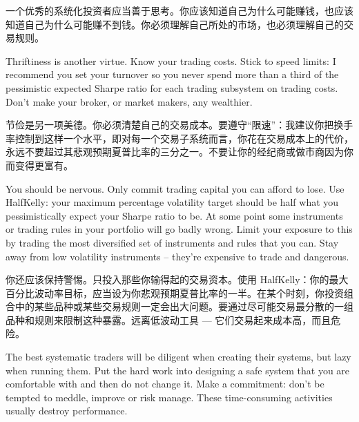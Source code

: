 \begin{chineseblock}一个优秀的系统化投资者应当善于思考。你应该知道自己为什么可能赚钱，也应该知道自己为什么可能赚不到钱。你必须理解自己所处的市场，也必须理解自己的交易规则。\end{chineseblock}

\bipairgap

\begin{englishblock} Thriftiness is another virtue. Know your trading costs. Stick to speed limits: I recommend you set your turnover so you never spend more than a third of the pessimistic expected Sharpe ratio for each trading subsystem on trading costs. Don't make your broker, or market makers, any wealthier. \end{englishblock}

\begin{chineseblock}节俭是另一项美德。你必须清楚自己的交易成本。要遵守“限速”：我建议你把换手率控制到这样一个水平，即对每一个交易子系统而言，你花在交易成本上的代价，永远不要超过其悲观预期夏普比率的三分之一。不要让你的经纪商或做市商因为你而变得更富有。\end{chineseblock}

\bipairgap

\begin{englishblock} You should be nervous. Only commit trading capital you can afford to lose. Use HalfKelly: your maximum percentage volatility target should be half what you pessimistically expect your Sharpe ratio to be. At some point some instruments or trading rules in your portfolio will go badly wrong. Limit your exposure to this by trading the most diversified set of instruments and rules that you can. Stay away from low volatility instruments -- they're expensive to trade and dangerous. \end{englishblock}

\begin{chineseblock}你还应该保持警惕。只投入那些你输得起的交易资本。使用 HalfKelly：你的最大百分比波动率目标，应当设为你悲观预期夏普比率的一半。在某个时刻，你投资组合中的某些品种或某些交易规则一定会出大问题。要通过尽可能交易最分散的一组品种和规则来限制这种暴露。远离低波动工具 --- 它们交易起来成本高，而且危险。\end{chineseblock}

\bipairgap

\begin{englishblock} The best systematic traders will be diligent when creating their systems, but lazy when running them. Put the hard work into designing a safe system that you are comfortable with and then do not change it. Make a commitment: don't be tempted to meddle, improve or risk manage. These time-consuming activities usually destroy performance. \end{englishblock}


